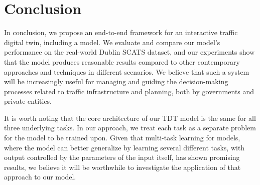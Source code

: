 \section{Conclusion}\label{sec:conclusion}
In conclusion, we propose an end-to-end framework for an interactive traffic digital twin, including a model. We evaluate and compare our model's performance on the real-world Dublin SCATS dataset, and our experiments show that the model produces reasonable results compared to other contemporary approaches and techniques in different scenarios. We believe that such a system will be increasingly useful for managing and guiding the decision-making processes related to traffic infrastructure and planning, both by governments and private entities.

It is worth noting that the core architecture of our TDT model is the same for all three underlying tasks. In our approach, we treat each task as a separate problem for the model to be trained upon. Given that multi-task learning for models, where the model can better generalize by learning several different tasks, with output controlled by the parameters of the input itself, has shown promising results, we believe it will be worthwhile to investigate the application of that approach to our model.
